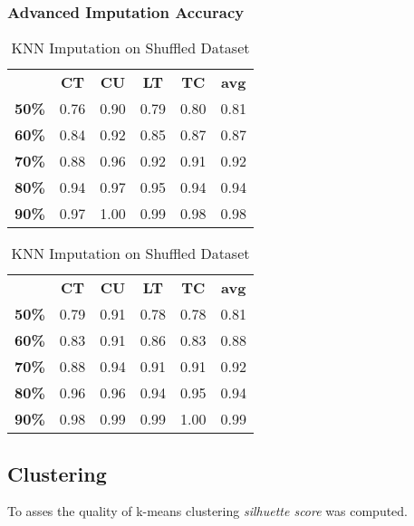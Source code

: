 \documentclass{article}
\begin{document}
\subsubsection{Advanced Imputation Accuracy}
\begin{table}[h]
\begin{minipage}{.45\textwidth}\centering
\begin{tabular}{cccccc}
			  & \textbf{CT} & \textbf{CU} & \textbf{LT} & \textbf{TC} & \textbf{avg} \\
\textbf{50\%} & 0.76        & 0.90        & 0.79        & 0.80        & 0.81 \\
\textbf{60\%} & 0.84        & 0.92        & 0.85        & 0.87        & 0.87 \\
\textbf{70\%} & 0.88        & 0.96        & 0.92        & 0.91        & 0.92 \\
\textbf{80\%} & 0.94        & 0.97        & 0.95        & 0.94        & 0.94 \\
\textbf{90\%} & 0.97        & 1.00        & 0.99        & 0.98        & 0.98
\end{tabular}
\caption{KNN Imputation}
\end{minipage}
\hfill
\begin{minipage}{.5\textwidth}\centering
\begin{tabular}{cccccc}
			  & \textbf{CT} & \textbf{CU} & \textbf{LT} & \textbf{TC} & \textbf{avg} \\
\textbf{50\%} & 0.79        & 0.91        & 0.78        & 0.78        & 0.81 \\
\textbf{60\%} & 0.83        & 0.91        & 0.86        & 0.83        & 0.88 \\
\textbf{70\%} & 0.88        & 0.94        & 0.91        & 0.91        & 0.92 \\
\textbf{80\%} & 0.96        & 0.96        & 0.94        & 0.95        & 0.94 \\
\textbf{90\%} & 0.98        & 0.99        & 0.99        & 1.00        & 0.99
\end{tabular}
\caption{KNN Imputation on Shuffled Dataset}
\end{minipage}
\end{table}

\subsection{Clustering}
To asses the quality of k-means clustering \emph{silhuette score} was computed.
\end{document}
